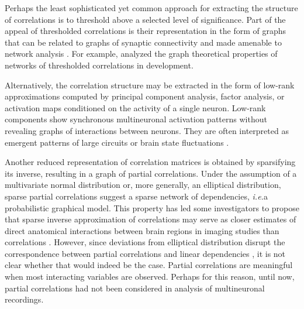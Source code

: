\documentclass[10pt]{article}
\begin{document}
Perhaps the least sophisticated yet common approach for extracting the structure of correlations is to threshold above a selected level of significance. Part of the appeal of thresholded correlations is their representation in the form of graphs that can be related to graphs of synaptic connectivity and made amenable to network analysis \cite{Bullmore:2012}. For example, \cite{Malmersjo:2013} analyzed the graph theoretical properties of networks of thresholded correlations in development. 

Alternatively, the correlation structure may be extracted in the form of low-rank approximations computed by principal component analysis, factor analysis, or activation maps conditioned on the activity of a single neuron. Low-rank components show synchronous multineuronal activation patterns without revealing graphs of interactions between neurons. They are often interpreted as emergent patterns of large circuits or brain state fluctuations \cite{Kenet:2003}.

Another reduced representation of correlation matrices is obtained by sparsifying its inverse, resulting in a graph of partial correlations. Under the assumption of a multivariate normal distribution or, more generally, an elliptical distribution, sparse partial correlations suggest a sparse network of dependencies, \emph{i.e.}\;a probabilistic graphical model. This property has led some investigators to propose that sparse inverse approximation of correlations may serve as closer estimates of direct anatomical interactions between brain regions in imaging studies than correlations \cite{Varoquaux:2012,Ryali:2012}. However, since deviations from elliptical distribution disrupt the correspondence between partial correlations and linear dependencies \cite{Loh:2012}, it is not clear whether that would indeed be the case. Partial correlations are meaningful when most interacting variables are observed. Perhaps for this reason, until now, partial correlations had not been considered in analysis of multineuronal recordings.
\end{document}
